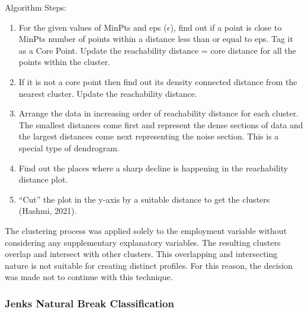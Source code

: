 \documentclass[11pt, a4paper]{article}
\begin{document}
Algorithm Steps:

\begin{enumerate}
\item For the given values of MinPts and eps ($\epsilon$), find out if a point is  close to  MinPts  number of points within a distance less than or equal to eps. Tag it as a Core Point. Update the reachability distance = core distance for all the points within the cluster.
\item If it is not a core point then find out its density connected distance from the nearest cluster. Update the reachability distance.
\item Arrange the data in increasing order of reachability distance for each cluster. The smallest distances come first and represent the dense sections of data and the largest distances come next representing the noise section. This is a special type of dendrogram.
\item Find out the places where a sharp decline is happening in the reachability distance plot.
\item ``Cut'' the plot in the y-axis by a suitable distance to get the clusters (Hashmi, 2021).
\end{enumerate}

The clustering process was applied solely to the employment variable without considering any supplementary explanatory variables. The resulting clusters overlap and intersect with other clusters. This overlapping and intersecting nature is not suitable for creating distinct profiles. For this reason, the decision was made not to continue with this technique.







\subsubsection{Jenks Natural Break Classification}
\end{document}
